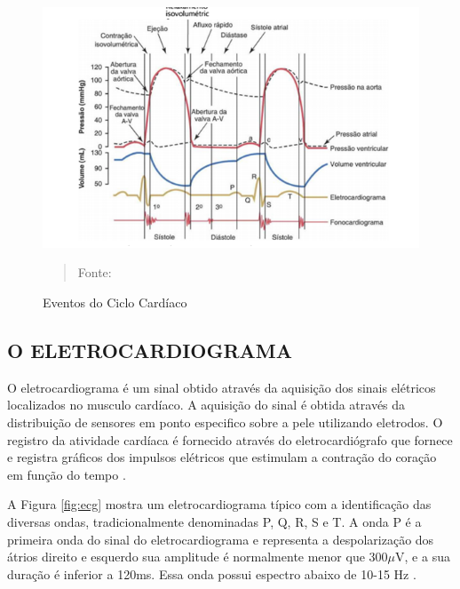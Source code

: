 \documentclass[12pt, a4paper]{article}
\begin{document}
\begin{figure}[H]
\begin{center}
			\caption{Eventos do Ciclo Cardíaco}
			\includegraphics[width=.5\textwidth]{Figuras/ecc.png}
            \vspace*{\fill} 
            \begin{quote} 
            \centering 
            Fonte: \cite{guyton}
            \end{quote}
            \vspace*{\fill}
			\label{fig:card}
\end{center}
\end{figure}


\subsection{O ELETROCARDIOGRAMA}

\hspace*{0.8cm}O eletrocardiograma é um sinal obtido através da aquisição dos sinais elétricos localizados no musculo cardíaco. A aquisição do sinal é obtida através da distribuição de sensores em ponto especifico sobre a pele utilizando eletrodos. O registro da atividade cardíaca é fornecido através do eletrocardiógrafo que fornece e registra gráficos dos impulsos elétricos que estimulam a contração do coração em função do tempo \cite{thaler}.

A Figura \ref{fig:ecg} mostra um eletrocardiograma típico com a identificação das diversas ondas, tradicionalmente denominadas P, Q, R, S e T. A onda P é a primeira onda do sinal do eletrocardiograma e representa a despolarização dos átrios direito e esquerdo sua amplitude é normalmente menor que 300$\mu$V, e a sua duração é inferior a 120ms. Essa onda possui espectro abaixo de 10-15 Hz \cite{sornmo}.
\end{document}
